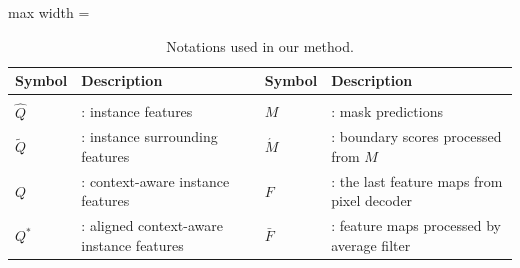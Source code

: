 
\begin{table}[!t]
    \centering
    \caption{Notations used in our method.}
    \vspace{-3mm}
    \begin{adjustbox}{max width = \textwidth}
    \begin{tabular}{ll|ll}
    \toprule
    Symbol & Description & Symbol & Description \\ \hline \\[-7pt] 
    $\hat{Q}$ & : instance features  & $M$  & : mask predictions  \\
    $\tilde{Q}$ & : instance surrounding features  & $\acute{M}$ & : boundary scores processed from $M$  \\ 
    ${Q}$ & : context-aware instance features  &  $F$  & : the last feature maps from pixel decoder  \\ 
    ${Q}^{*}$ & : aligned context-aware instance features  &  $\bar{F}$  & : feature maps processed by average filter  \\ 
    \bottomrule
    \end{tabular}
    \end{adjustbox}
    \label{tab:notations}
    \vspace{-3mm}
\end{table}